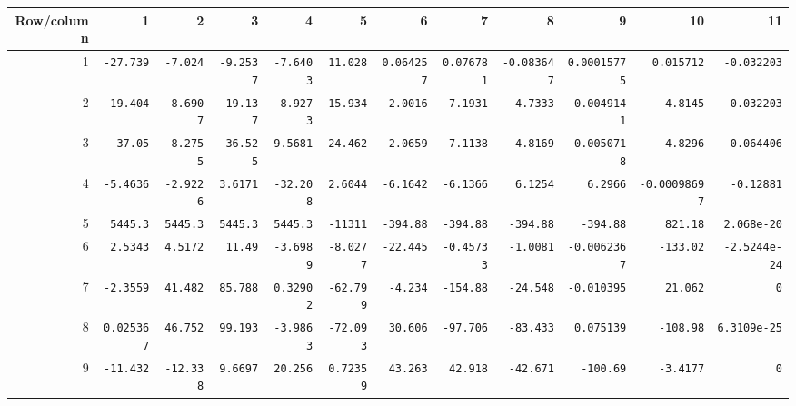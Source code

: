 \begin{landscape}
\begin{tabular}{rrrrrrrrrrrr}
Row/column & 1 & 2 & 3 & 4 & 5 & 6 & 7 & 8 & 9 & 10 & 11 \\ \midrule

1 & \texttt{-27.739} & \texttt{-7.024} & \texttt{-9.2537} & \texttt{-7.6403} & \texttt{11.028} & \texttt{0.064257} & \texttt{0.076781} & \texttt{-0.083647} & \texttt{0.00015775} & \texttt{0.015712} & \texttt{-0.032203} \\

2 & \texttt{-19.404} & \texttt{-8.6907} & \texttt{-19.137} & \texttt{-8.9273} & \texttt{15.934} & \texttt{-2.0016} & \texttt{7.1931} & \texttt{4.7333} & \texttt{-0.0049141} & \texttt{-4.8145} & \texttt{-0.032203} \\

3 & \texttt{-37.05} & \texttt{-8.2755} & \texttt{-36.525} & \texttt{9.5681} & \texttt{24.462} & \texttt{-2.0659} & \texttt{7.1138} & \texttt{4.8169} & \texttt{-0.0050718} & \texttt{-4.8296} & \texttt{0.064406} \\

4 & \texttt{-5.4636} & \texttt{-2.9226} & \texttt{3.6171} & \texttt{-32.208} & \texttt{2.6044} & \texttt{-6.1642} & \texttt{-6.1366} & \texttt{6.1254} & \texttt{6.2966} & \texttt{-0.00098697} & \texttt{-0.12881} \\

5 & \texttt{5445.3} & \texttt{5445.3} & \texttt{5445.3} & \texttt{5445.3} & \texttt{-11311} & \texttt{-394.88} & \texttt{-394.88} & \texttt{-394.88} & \texttt{-394.88} & \texttt{821.18} & \texttt{2.068e-20} \\

6 & \texttt{2.5343} & \texttt{4.5172} & \texttt{11.49} & \texttt{-3.6989} & \texttt{-8.0277} & \texttt{-22.445} & \texttt{-0.45733} & \texttt{-1.0081} & \texttt{-0.0062367} & \texttt{-133.02} & \texttt{-2.5244e-24} \\

7 & \texttt{-2.3559} & \texttt{41.482} & \texttt{85.788} & \texttt{0.32902} & \texttt{-62.799} & \texttt{-4.234} & \texttt{-154.88} & \texttt{-24.548} & \texttt{-0.010395} & \texttt{21.062} & \texttt{0} \\

8 & \texttt{0.025367} & \texttt{46.752} & \texttt{99.193} & \texttt{-3.9863} & \texttt{-72.093} & \texttt{30.606} & \texttt{-97.706} & \texttt{-83.433} & \texttt{0.075139} & \texttt{-108.98} & \texttt{6.3109e-25} \\

9 & \texttt{-11.432} & \texttt{-12.338} & \texttt{9.6697} & \texttt{20.256} & \texttt{0.72359} & \texttt{43.263} & \texttt{42.918} & \texttt{-42.671} & \texttt{-100.69} & \texttt{-3.4177} & \texttt{0} \\


\end{tabular}
\end{landscape}
